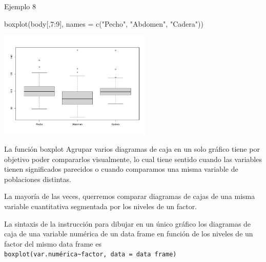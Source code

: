 \documentclass[
  ignorenonframetext,
  aspectratio=169]{beamer}
\newenvironment{Shaded}{\begin{snugshade}}{\end{snugshade}}
\newcommand{\AttributeTok}[1]{\textcolor[rgb]{0.77,0.63,0.00}{#1}}
\newcommand{\DecValTok}[1]{\textcolor[rgb]{0.00,0.00,0.81}{#1}}
\newcommand{\FunctionTok}[1]{\textcolor[rgb]{0.00,0.00,0.00}{#1}}
\newcommand{\NormalTok}[1]{#1}
\newcommand{\SpecialCharTok}[1]{\textcolor[rgb]{0.00,0.00,0.00}{#1}}
\newcommand{\StringTok}[1]{\textcolor[rgb]{0.31,0.60,0.02}{#1}}
\begin{document}
\begin{frame}[fragile]{Ejemplo 8}
\protect\hypertarget{ejemplo-8-1}{}
\begin{Shaded}
\begin{Highlighting}[]
\FunctionTok{boxplot}\NormalTok{(body[,}\DecValTok{7}\SpecialCharTok{:}\DecValTok{9}\NormalTok{], }\AttributeTok{names =} \FunctionTok{c}\NormalTok{(}\StringTok{"Pecho"}\NormalTok{, }\StringTok{"Abdomen"}\NormalTok{, }\StringTok{"Cadera"}\NormalTok{))}
\end{Highlighting}
\end{Shaded}

\begin{center}\includegraphics[width=275px]{Hora5_files/figure-beamer/unnamed-chunk-13-1} \end{center}
\end{frame}

\begin{frame}[fragile]{La función boxplot}
\protect\hypertarget{la-funciuxf3n-boxplot-3}{}
Agrupar varios diagramas de caja en un solo gráfico tiene por objetivo
poder compararlos visualmente, lo cual tiene sentido cuando las
variables tienen significados parecidos o cuando comparamos una misma
variable de poblaciones distintas.

La mayoría de las veces, querremos comparar diagramas de cajas de una
misma variable cuantitativa segmentada por los niveles de un factor.

La sintaxis de la instrucción para dibujar en un único gráfico los
diagramas de caja de una variable numérica de un data frame en función
de los niveles de un factor del mismo data frame es
\texttt{boxplot(var.numérica\textasciitilde{}factor,\ data\ =\ data\ frame)}
\end{frame}
\end{document}
